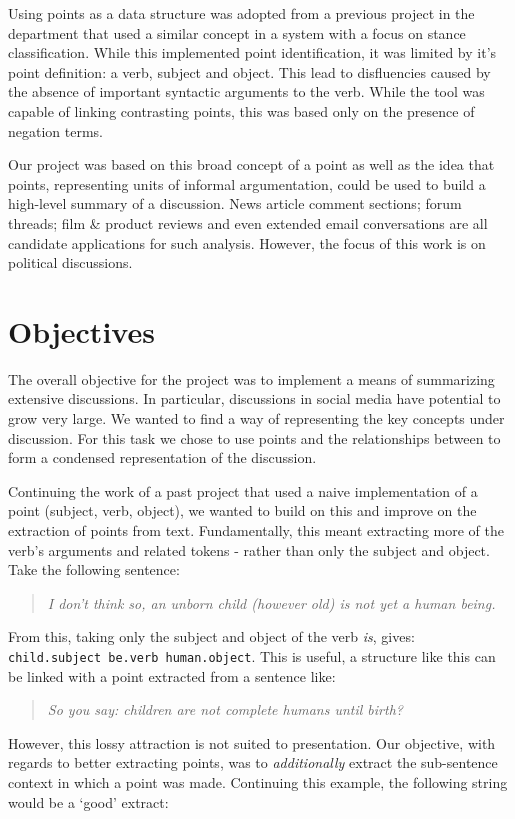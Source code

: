     Using points as a data structure was adopted from a previous project in the department that used a similar concept in a system with a focus on stance classification. While this implemented point identification, it was limited by it's point definition: a verb, subject and object. This lead to disfluencies caused by the absence of important syntactic arguments to the verb. While the tool was capable of linking contrasting points, this was based only on the presence of negation terms.

    Our project was based on this broad concept of a point as well as the idea that points, representing units of informal argumentation, could be used to build a high-level summary of a discussion. News article comment sections; forum threads; film \& product reviews and even extended email conversations are all candidate applications for such analysis. However, the focus of this work is on political discussions.

  \section{Objectives}
    The overall objective for the project was to implement a means of summarizing extensive discussions. In particular, discussions in social media have potential to grow very large. We wanted to find a way of representing the key concepts under discussion. For this task we chose to use points and the relationships between to form a condensed representation of the discussion.

    Continuing the work of a past project that used a naive implementation of a point (subject, verb, object), we wanted to build on this and improve on the extraction of points from text. Fundamentally, this meant extracting more of the verb's arguments and related tokens - rather than only the subject and object. Take the following sentence:

    \medskip
    \begin{center}
    \blockquote{\textit{I don't think so, an unborn child (however old) is not yet a human being.}}
    \end{center}
    \medskip

    From this, taking only the subject and object of the verb \textit{is}, gives: \texttt{child.subject be.verb human.object}. This is useful, a structure like this can be linked with a point extracted from a sentence like: \blockquote{\textit{So you say: children are not complete humans until birth?}}. However, this lossy attraction is not suited to presentation. Our objective, with regards to better extracting points, was to \textit{additionally} extract the sub-sentence context in which a point was made. Continuing this example, the following string would be a `good' extract:

